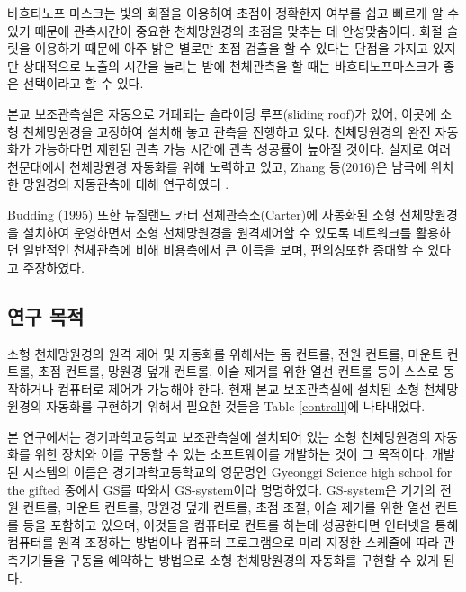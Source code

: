 바흐티노프 마스크는 빛의 회절을 이용하여 초점이 정확한지 여부를  쉽고 빠르게 알 수 있기 때문에 관측시간이 중요한 천체망원경의 초점을 맞추는 데 안성맞춤이다. 회절 슬릿을 이용하기 때문에 아주 밝은 별로만 초점 검출을 할 수 있다는 단점을 가지고 있지만 상대적으로 노출의 시간을 늘리는 밤에 천체관측을 할 때는 바흐티노프마스크가 좋은 선택이라고 할 수 있다.

본교 보조관측실은 자동으로 개폐되는 슬라이딩 루프(sliding roof)가 있어, 이곳에 소형 천체망원경을 고정하여 설치해 놓고 관측을 진행하고 있다. 천체망원경의 완전 자동화가 가능하다면 제한된 관측 가능 시간에 관측 성공률이 높아질 것이다. 실제로 여러 천문대에서 천체망원경 자동화를 위해 노력하고 있고, Zhang 등(2016)은 남극에 위치한 망원경의 자동관측에 대해 연구하였다 \cite{Zhang2016}.

Budding (1995) 또한 뉴질랜드 카터 천체관측소(Carter)에 자동화된 소형 천체망원경을 설치하여 운영하면서 소형 천체망원경을 원격제어할 수 있도록 네트워크를 활용하면 일반적인 천체관측에 비해 비용측에서 큰 이득을 보며, 편의성또한 증대할 수 있다고 주장하였다.\cite{budding1995global} 



\subsection{연구 목적}


소형 천체망원경의 원격 제어 및 자동화를 위해서는 돔 컨트롤, 전원 컨트롤, 마운트 컨트롤, 초점 컨트롤, 망원경 덮개 컨트롤, 이슬 제거를 위한 열선 컨트롤 등이 스스로 동작하거나 컴퓨터로 제어가 가능해야 한다. 현재 본교 보조관측실에 설치된 소형 천체망원경의 자동화를 구현하기 위해서 필요한 것들을 \textrm{Table} \ref{controll}에 나타내었다.


본 연구에서는 경기과학고등학교 보조관측실에 설치되어 있는 소형 천체망원경의 자동화를 위한 장치와 이를 구동할 수 있는 소프트웨어를 개발하는 것이 그 목적이다. 개발된 시스템의 이름은 경기과학고등학교의 영문명인 Gyeonggi Science high school for the gifted 중에서 GS를 따와서 GS-system이라 명명하였다. GS-system은 기기의 전원 컨트롤, 마운트 컨트롤, 망원경 덮개 컨트롤, 초점 조절, 이슬 제거를 위한 열선 컨트롤 등을 포함하고 있으며, 이것들을 컴퓨터로 컨트롤 하는데 성공한다면 인터넷을 통해 컴퓨터를 원격 조정하는 방법이나 컴퓨터 프로그램으로 미리 지정한 스케줄에 따라 관측기기들을 구동을 예약하는 방법으로 소형 천체망원경의 자동화를 구현할 수 있게 된다. 

